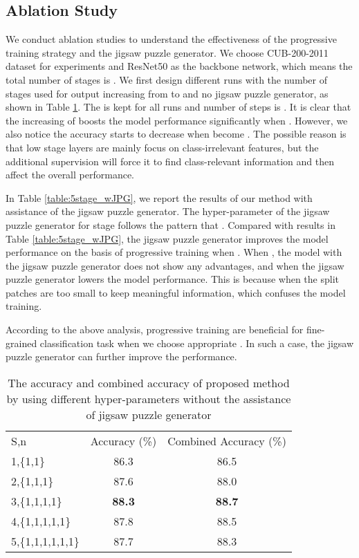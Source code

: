 \documentclass{llncs}
\begin{document}
\subsection{Ablation Study}\label{ssec:ablation}

We conduct ablation studies to understand the effectiveness of the progressive training strategy and the jigsaw puzzle generator. We choose CUB-200-2011 dataset for experiments and ResNet50 as the backbone network, which means the total number of stages  is . We first design different runs with the number of stages used for output  increasing from  to  and no jigsaw puzzle generator, as shown in Table \ref{table:5stage_woJPG}. The  is kept for all runs and number of steps is . It is clear that the increasing of  boosts the model performance significantly when . However, we also notice the accuracy starts to decrease when  become . The possible reason is that low stage layers are mainly focus on class-irrelevant features, but the additional supervision will force it to find class-relevant information and then affect the overall performance.

In Table \ref{table:5stage_wJPG}, we report the results of our method with assistance of the jigsaw puzzle generator. The hyper-parameter  of the jigsaw puzzle generator for  stage follows the pattern that . Compared with results in Table \ref{table:5stage_wJPG}, the jigsaw puzzle generator improves the model performance on the basis of progressive training when . When , the model with the jigsaw puzzle generator does not show any advantages, and when  the jigsaw puzzle generator lowers the model performance. This is because when  the split patches are too small to keep meaningful information, which confuses the model training.

According to the above analysis, progressive training are beneficial for fine-grained classification task when we choose appropriate . In such a case, the jigsaw puzzle generator can further improve the performance.

\setlength{\tabcolsep}{4pt}
\begin{table}[!t]
\begin{center}
\caption{The accuracy and combined accuracy of proposed method by using different hyper-parameters  without the assistance of jigsaw puzzle generator}
\label{table:5stage_woJPG}
\begin{tabular}{lcc}
\hline\noalign{\smallskip}
S,n & Accuracy (\%) & Combined Accuracy (\%)\\
\noalign{\smallskip}
\hline
\noalign{\smallskip}
1,\{1,1\} & 86.3 & 86.5\\
2,\{1,1,1\} & 87.6 & 88.0\\
3,\{1,1,1,1\} & {\bf 88.3} & {\bf 88.7}\\
4,\{1,1,1,1,1\} & 87.8 & 88.5\\
5,\{1,1,1,1,1,1\} & 87.7 & 88.3\\
\hline
\end{tabular}
\end{center}
\end{table}
\setlength{\tabcolsep}{1.4pt}
\end{document}
